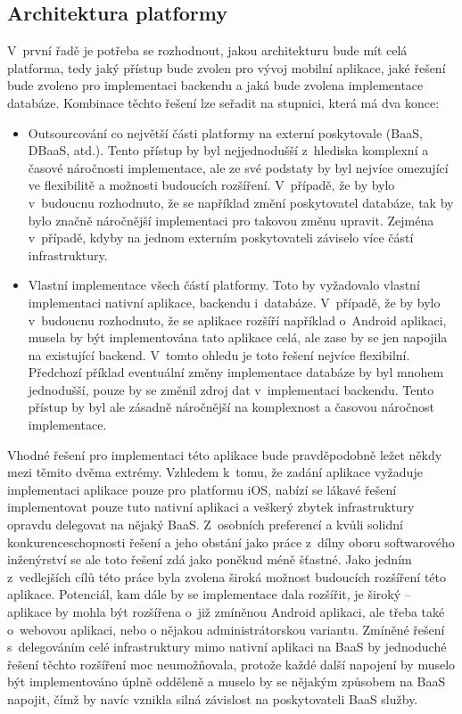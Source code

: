 \subsection{Architektura platformy}

V~první řadě je potřeba se rozhodnout, jakou architekturu bude mít celá platforma, tedy jaký přístup bude zvolen pro vývoj mobilní aplikace, jaké řešení bude zvoleno pro implementaci backendu a jaká bude zvolena implementace databáze. Kombinace těchto řešení lze seřadit na stupnici, která má dva konce:
\begin{itemize}
\item Outsourcování co největší části platformy na externí poskytovale (BaaS, DBaaS, atd.). Tento přístup by byl nejjednodušší z~hlediska komplexní a časové náročnosti implementace, ale ze své podstaty by byl nejvíce omezující ve flexibilitě a možnosti budoucích rozšíření. V~případě, že by bylo v~budoucnu rozhodnuto, že se například změní poskytovatel databáze, tak by bylo značně náročnější implementaci pro takovou změnu upravit. Zejména v~případě, kdyby na jednom externím poskytovateli záviselo více částí infrastruktury.
\item Vlastní implementace všech částí platformy. Toto by vyžadovalo vlastní implementaci nativní aplikace, backendu i~databáze. V~případě, že by bylo v~budoucnu rozhodnuto, že se aplikace rozšíří například o~Android aplikaci, musela by být implementována tato aplikace celá, ale zase by se jen napojila na existující backend. V~tomto ohledu je toto řešení nejvíce flexibilní. Předchozí příklad eventuální změny implementace databáze by byl mnohem jednodušší, pouze by se změnil zdroj dat v~implementaci backendu. Tento přístup by byl ale zásadně náročnější na komplexnost a časovou náročnost implementace. 
\end{itemize}

Vhodné řešení pro implementaci této aplikace bude pravděpodobně ležet někdy mezi těmito dvěma extrémy. Vzhledem k~tomu, že zadání aplikace vyžaduje implementaci aplikace pouze pro platformu iOS, nabízí se lákavé řešení implementovat pouze tuto nativní aplikaci a veškerý zbytek infrastruktury opravdu delegovat na nějaký BaaS. Z~osobních preferencí a kvůli solidní konkurenceschopnosti řešení a jeho obstání jako práce z~dílny oboru softwarového inženýrství se ale toto řešení zdá jako poněkud méně šťastné. Jako jedním z~vedlejších cílů této práce byla zvolena široká možnost budoucích rozšíření této aplikace. Potenciál, kam dále by se implementace dala rozšířit, je široký – aplikace by mohla být rozšířena o~již zmíněnou Android aplikaci, ale třeba také o~webovou aplikaci, nebo o nějakou administrátorskou variantu. Zmíněné řešení s~delegováním celé infrastruktury mimo nativní aplikaci na BaaS by jednoduché řešení těchto rozšíření moc neumožňovala, protože každé další napojení by muselo být implementováno úplně odděleně a muselo by se nějakým způsobem na BaaS napojit, čímž by navíc vznikla silná závislost na poskytovateli BaaS služby.

